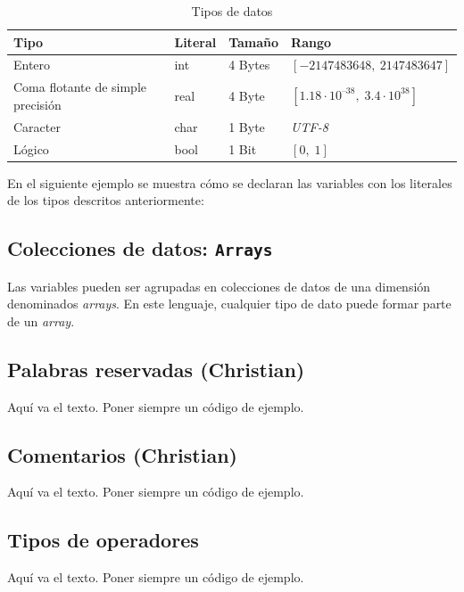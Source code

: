\documentclass[11pt, english]{article}
\begin{document}
\begin{table}[h!]
	\begin{center}
		\caption{Tipos de datos}
		\label{tab:table1}
		\begin{tabular}{l|l|l|l}
			\toprule
			\textbf{Tipo} & \textbf{Literal} & \textbf{Tamaño} & \textbf{Rango}\\
			\midrule
			Entero & int &4 Bytes & $\left [-2147483648,\: 2147483647 \right]$\\
			Coma flotante de simple precisión & real & 4 Byte & $\left [ 1.18 \cdot 10^{–38},\; 3.4 \cdot 10^{38} \right ]$\\
			Caracter & char & 1 Byte & \emph{UTF-8}\\
			Lógico & bool & 1 Bit & $\left [0,\; 1 \right ]$\\
			\bottomrule
		\end{tabular}
	\end{center}
\end{table}

En el siguiente ejemplo se muestra cómo se declaran las variables con los literales de los tipos descritos anteriormente:



\subsection{Colecciones de datos: \texttt{Arrays}}
Las variables pueden ser agrupadas en colecciones de datos de una dimensión denominados \emph{arrays}. En este lenguaje, cualquier tipo de dato puede formar parte de un \emph{array}.

\newpage

\subsection{Palabras reservadas (Christian)}
Aquí va el texto. Poner siempre un código de ejemplo.
\newpage

\subsection{Comentarios (Christian)}
Aquí va el texto. Poner siempre un código de ejemplo.
\newpage

\subsection{Tipos de operadores}
Aquí va el texto. Poner siempre un código de ejemplo.
\end{document}

